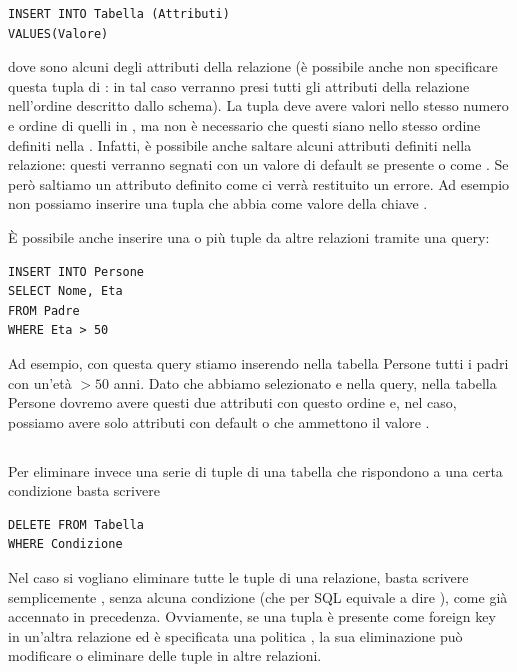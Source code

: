 \documentclass[11pt, a4paper, titlepage, oneside]{scrbook}
\begin{document}
\begin{lstlisting}
INSERT INTO Tabella (Attributi)
VALUES(Valore)
\end{lstlisting}

dove  sono alcuni degli attributi della relazione  (è possibile anche non specificare questa tupla di : in tal caso verranno presi tutti gli attributi della relazione nell'ordine descritto dallo schema). La tupla  deve avere valori nello stesso numero e ordine di quelli in , ma non è necessario che questi siano nello stesso ordine definiti nella . Infatti, è possibile anche saltare alcuni attributi definiti nella relazione: questi verranno segnati con un valore di default se presente o come . Se però saltiamo un attributo definito come  ci verrà restituito un errore. Ad esempio non possiamo inserire una tupla che abbia come valore della chiave .

È possibile anche inserire una o più tuple da altre relazioni tramite una query:

\begin{lstlisting}
INSERT INTO Persone
SELECT Nome, Eta
FROM Padre
WHERE Eta > 50
\end{lstlisting}

Ad esempio, con questa query stiamo inserendo nella tabella Persone tutti i padri con un'età $> 50$ anni. Dato che abbiamo selezionato  e  nella query, nella tabella Persone dovremo avere questi due attributi con questo ordine e, nel caso, possiamo avere solo attributi con default o che ammettono il valore .

\subsection*{}

Per eliminare invece una serie di tuple di una tabella che rispondono a una certa condizione basta scrivere

\begin{lstlisting}
DELETE FROM Tabella
WHERE Condizione
\end{lstlisting}

Nel caso si vogliano eliminare tutte le tuple di una relazione, basta scrivere semplicemente , senza alcuna condizione (che per SQL equivale a dire ), come già accennato in precedenza. Ovviamente, se una tupla è presente come foreign key in un'altra relazione ed è specificata una politica , la sua eliminazione può modificare o eliminare delle tuple in altre relazioni.
\end{document}
